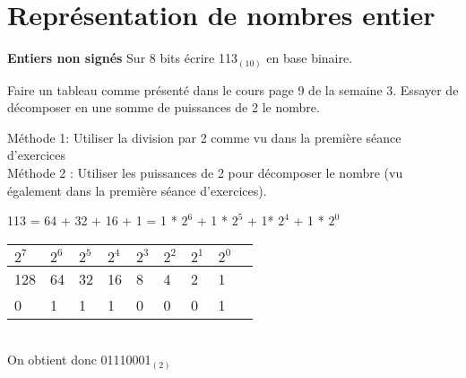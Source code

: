 \section{Représentation de nombres entier}

\begin{Exercice}[5 minutes] \textbf{Entiers non signés}
	Sur 8 bits écrire 113$_{(10)}$ en base binaire.
   
    \begin{conseil}
		Faire un tableau comme présenté dans le cours page 9 de la semaine 3. Essayer de décomposer en une somme de puissances de 2 le nombre.
    \end{conseil}
    
    \begin{solution}
        Méthode 1: Utiliser la division par 2 comme vu dans la première séance d'exercices\\
        
        Méthode 2 : Utiliser les puissances de 2 pour décomposer le nombre (vu également dans la première séance d'exercices).
        
        113 = 64 + 32 + 16 + 1 = 1 * $2^6$ + 1 * $2^5$ + 1* $2^4$ + 1 * $2^0$ \\
        
        \begin{tabular}{| p{1cm} | p{1cm} | p{1cm} | p{1cm} | p{1cm} | p{1cm} | p{1cm} | p{1cm} | p{1cm} |} 
            \hline
	      	$2^7$ & $2^6$ & $2^5$ & $2^4$ & $2^3$ & $2^2$ & $2^1$ & $2^0$ \\ [0.5ex]
	    	\hline
            128 & 64 & 32 & 16 & 8 & 4 & 2 & 1 \\ [0.5ex] 
            \hline
            0 & 1 & 1 & 1 & 0 & 0 & 0 & 1 \\ [0.5ex] 
            \hline
        \end{tabular} \\
        
        On obtient donc 01110001$_{(2)}$ \\
    \end{solution}
\end{Exercice}

